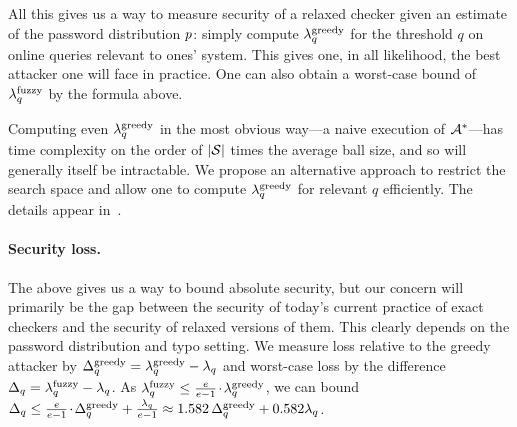 


\iffalse
\tnote{broken theorem}
\begin{theorem}[\textbf{Optimal attacker $\advA^*$}]  For any setting $(\pwprob,\typoprob)$
and a relaxed, deterministic checker $\checker$, $\advA^*$ is an optimal
adversary. That is, $\advantage(\checker,\advA^*, q) = \fuzzlambda_q$.
\end{theorem}
\fi



All this gives us a way to
measure security of a relaxed checker given an estimate of the
password distribution $p$: simply compute $\lambda^\textnormal{greedy}_q$  for
the threshold $q$ on online queries relevant to ones' system. This gives one, in
all likelihood, the best attacker one will face in practice. One can also obtain 
a worst-case bound of $\lambda^\textnormal{fuzzy}_q$ by the formula above. 

Computing even $\lambda^\textnormal{greedy}_q$ in the most obvious way---a naive execution of $\advA^*$---has time complexity
on the order of $|\mathcal{S}|$ times the average ball size, and so
will generally itself be intractable.  We propose an alternative approach
to restrict the search space and allow one to compute $\lambda^\textnormal{greedy}_q$
for relevant $q$ efficiently.  The details appear
in~.

\paragraph{Security loss.} 
The above gives us a way to bound absolute security, but our concern
will primarily be the gap between the security of today's current
practice of exact checkers and the security of relaxed versions of
them. This clearly depends on the password distribution and typo
setting.  We measure loss relative to the greedy attacker by
$\Delta^\textnormal{greedy}_q = \lambda^\textnormal{greedy}_q - \lambda_q$ and worst-case loss by the difference
$\Delta_q = \lambda^\textnormal{fuzzy}_q - \lambda_q$. 
As $\lambda^\textnormal{fuzzy}_q\le {e\over e-1}{\hspace{-0.1ex}}{\hspace{-0.1ex}}{\hspace{-0.1ex}}\cdot{\hspace{-0.1ex}}{\hspace{-0.1ex}}{\hspace{-0.1ex}}\lambda^\textnormal{greedy}_q$, we can bound
$\Delta_q\le {e\over e-1}{\hspace{-0.1ex}}{\hspace{-0.1ex}}{\hspace{-0.1ex}}\cdot{\hspace{-0.1ex}}{\hspace{-0.1ex}}{\hspace{-0.1ex}}\Delta^\textnormal{greedy}_q + {\lambda_q\over e-1} \approx 1.582\,\Delta^\textnormal{greedy}_q + 0.582\lambda_q$. 

